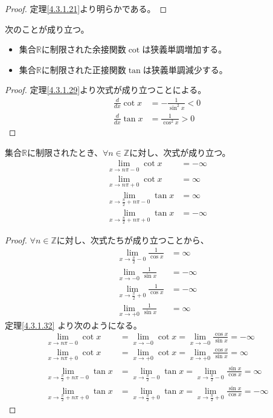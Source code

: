\documentclass[dvipdfmx]{jsarticle}
\begin{document}
\begin{proof} 定理\ref{4.3.1.21}より明らかである。
\end{proof}
\begin{thm}\label{4.3.1.33} 次のことが成り立つ。
\begin{itemize}
\item
  集合$\mathbb{R}$に制限された余接関数$\cot$は狭義単調増加する。
\item
  集合$\mathbb{R}$に制限された正接関数$\tan$は狭義単調減少する。
\end{itemize}
\end{thm}
\begin{proof} 定理\ref{4.3.1.29}より次式が成り立つことによる。
\begin{align*}
\frac{d}{dx}\cot x &= - \frac{1}{\sin^{2}x} < 0\\
\frac{d}{dx}\tan x &= \frac{1}{\cos^{2}x} > 0
\end{align*}
\end{proof}
\begin{thm}\label{4.3.1.34}
集合$\mathbb{R}$に制限されたとき、$\forall n \in \mathbb{Z}$に対し、次式が成り立つ。
\begin{align*}
  \lim_{x \rightarrow n\pi - 0}{\cot x} &= - \infty\\
  \lim_{x \rightarrow n\pi + 0}{\cot x} &= \infty\\
  \lim_{x \rightarrow \frac{\pi}{2} + n\pi - 0}{\tan x} &= \infty\\
  \lim_{x \rightarrow \frac{\pi}{2} + n\pi + 0}{\tan x} &= - \infty
\end{align*}
\end{thm}
\begin{proof} 
$\forall n \in \mathbb{Z}$に対し、次式たちが成り立つことから、
\begin{align*}
  \lim_{x \rightarrow \frac{\pi}{2} - 0}\frac{1}{\cos x} &= \infty\\
  \lim_{x \rightarrow - 0}\frac{1}{\sin x} &= - \infty\\
  \lim_{x \rightarrow \frac{\pi}{2} + 0}\frac{1}{\cos x} &= - \infty\\
  \lim_{x \rightarrow + 0}\frac{1}{\sin x} &= \infty
\end{align*}
定理\ref{4.3.1.32} より次のようになる。
\begin{align*}
\lim_{x \rightarrow n\pi - 0}{\cot x} &= \lim_{x \rightarrow - 0}{\cot x} = \lim_{x \rightarrow - 0}\frac{\cos x}{\sin x} = - \infty\\
\lim_{x \rightarrow n\pi + 0}{\cot x} &= \lim_{x \rightarrow + 0}{\cot x} = \lim_{x \rightarrow + 0}\frac{\cos x}{\sin x} = \infty\\
\lim_{x \rightarrow \frac{\pi}{2} + n\pi - 0}{\tan x} &= \lim_{x \rightarrow \frac{\pi}{2} - 0}{\tan x} = \lim_{x \rightarrow \frac{\pi}{2} - 0}\frac{\sin x}{\cos x} = \infty\\
\lim_{x \rightarrow \frac{\pi}{2} + n\pi + 0}{\tan x} &= \lim_{x \rightarrow \frac{\pi}{2} + 0}{\tan x} = \lim_{x \rightarrow \frac{\pi}{2} + 0}\frac{\sin x}{\cos x} = - \infty
\end{align*}
\end{proof}
\end{document}
